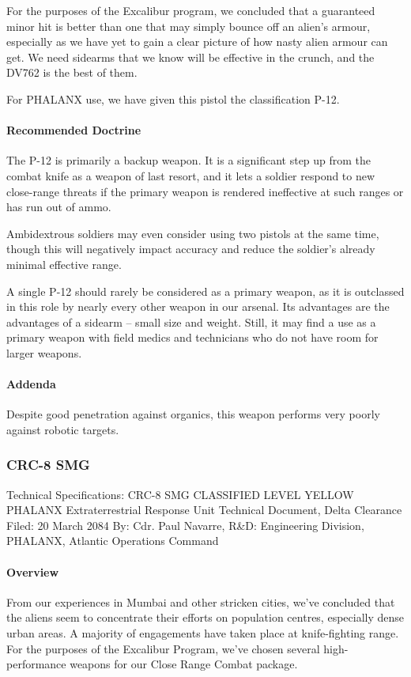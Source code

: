 For the purposes of the Excalibur program, we concluded that a guaranteed minor hit is better than one that may simply bounce off an alien's armour, especially as we have yet to gain a clear picture of how nasty alien armour can get. We need sidearms that we know will be effective in the crunch, and the DV762 is the best of them.

For PHALANX use, we have given this pistol the classification P-12.
\paragraph*{Recommended Doctrine}
The P-12 is primarily a backup weapon. It is a significant step up from the combat knife as a weapon of last resort, and it lets a soldier respond to new close-range threats if the primary weapon is rendered ineffective at such ranges or has run out of ammo.

Ambidextrous soldiers may even consider using two pistols at the same time, though this will negatively impact accuracy and reduce the soldier's already minimal effective range.

A single P-12 should rarely be considered as a primary weapon, as it is outclassed in this role by nearly every other weapon in our arsenal. Its advantages are the advantages of a sidearm -- small size and weight. Still, it may find a use as a primary weapon with field medics and technicians who do not have room for larger weapons.
\paragraph*{Addenda}
Despite good penetration against organics, this weapon performs very poorly against robotic targets.
\subsubsection*{CRC-8 SMG}
Technical Specifications: CRC-8 SMG
CLASSIFIED LEVEL YELLOW
PHALANX Extraterrestrial Response Unit
Technical Document, Delta Clearance
Filed: 20 March 2084
By: Cdr. Paul Navarre, R&D: Engineering Division, PHALANX, Atlantic Operations Command
\paragraph*{Overview}
From our experiences in Mumbai and other stricken cities, we've concluded that the aliens seem to concentrate their efforts on population centres, especially dense urban areas. A majority of engagements have taken place at knife-fighting range. For the purposes of the Excalibur Program, we've chosen several high-performance weapons for our Close Range Combat package.

